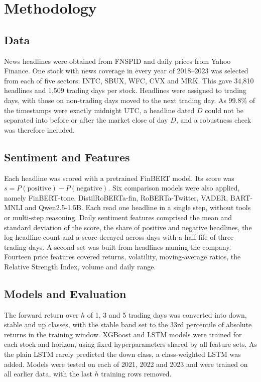 \documentclass[a4paper,11pt]{article}
\begin{document}
\section{Methodology}
\subsection{Data}
News headlines were obtained from FNSPID \cite{dong2024fnspid} and daily prices from Yahoo Finance. One stock with news coverage in every year of 2018--2023 was selected from each of five sectors: INTC, SBUX, WFC, CVX and MRK. This gave 34,810 headlines and 1,509 trading days per stock. Headlines were assigned to trading days, with those on non-trading days moved to the next trading day. As 99.8\% of the timestamps were exactly midnight UTC, a headline dated $D$ could not be separated into before or after the market close of day $D$, and a robustness check was therefore included.

\subsection{Sentiment and Features}
Each headline was scored with a pretrained FinBERT model. Its score was $s = P(\text{positive}) - P(\text{negative})$. Six comparison models were also applied, namely FinBERT-tone, DistilRoBERTa-fin, RoBERTa-Twitter, VADER, BART-MNLI and Qwen2.5-1.5B. Each read one headline in a single step, without tools or multi-step reasoning. Daily sentiment features comprised the mean and standard deviation of the score, the share of positive and negative headlines, the log headline count and a score decayed across days with a half-life of three trading days. A second set was built from headlines naming the company. Fourteen price features covered returns, volatility, moving-average ratios, the Relative Strength Index, volume and daily range.

\subsection{Models and Evaluation}
The forward return over $h$ of 1, 3 and 5 trading days was converted into down, stable and up classes, with the stable band set to the 33rd percentile of absolute returns in the training window. XGBoost \cite{chen2016xgboost} and LSTM \cite{hochreiter1997long} models were trained for each stock and horizon, using fixed hyperparameters shared by all feature sets. As the plain LSTM rarely predicted the down class, a class-weighted LSTM was added. Models were tested on each of 2021, 2022 and 2023 and were trained on all earlier data, with the last $h$ training rows removed.
\end{document}
